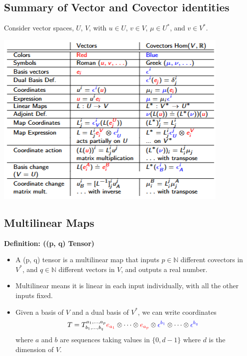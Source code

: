 \documentclass[10pt]{article}
\begin{document}
\subsection*{Summary of Vector and Covector identities}
Consider vector spaces, $U$, $V$, with $u \in U$, $v \in V$, $\mu \in U^*$, and $v \in V^*$.
\begin{center}
    \includegraphics*[scale=0.9]{W2_10.png}
\end{center}

\subsection*{Multilinear Maps}
\textbf{Definition: ((p, q) Tensor)}
\begin{itemize}
    \item A (p, q) tensor is a multilinear map that inputs $p \in \mathbb{N}$ different covectors in $V^*$, and $q \in \mathbb{N}$ different vectors in $V$, and outputs a real number.
    \item Multilinear means it is linear in each input individually, with all the other inputs fixed.
    \item Given a basis of $V$ and a dual basis of $V^*$, we can write coordinates
    \[T = T_{b_1, \dots, b_q}^{a_1, \dots, a_p} \textcolor{red}{e_{a_1}} \otimes \cdots \otimes \textcolor{red}{e_{a_p}} \otimes \textcolor{blue}{\epsilon^{b_1}} \otimes \cdots \otimes \textcolor{blue}{\epsilon^{b_q}}\]
    where $a$ and $b$ are sequences taking values in $\{0, d - 1\}$ where $d$ is the dimension of $V$.
\end{itemize}
\end{document}
